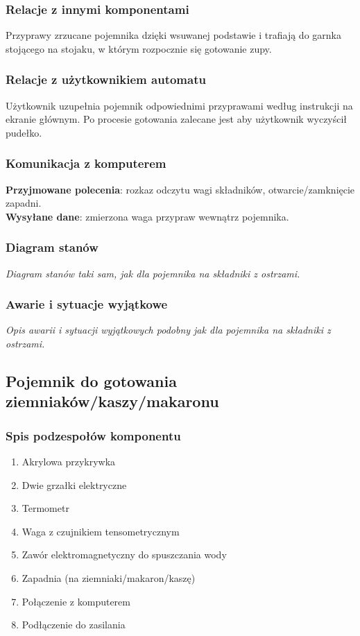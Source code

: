 \documentclass[12pt,a4paper,notitlepage]{article}
\begin{document}
\subsubsection{Relacje z innymi komponentami}
Przyprawy zrzucane pojemnika dzięki wsuwanej podstawie i trafiają do garnka stojącego na stojaku, w którym rozpocznie się gotowanie zupy.

\subsubsection{Relacje z użytkownikiem automatu}
Użytkownik uzupełnia pojemnik odpowiednimi przyprawami według instrukcji na ekranie głównym. Po procesie gotowania zalecane jest aby użytkownik wyczyścił pudełko.

\subsubsection{Komunikacja z komputerem}
\textbf{Przyjmowane polecenia}: rozkaz odczytu wagi składników, otwarcie/zamknięcie zapadni.\\
\textbf{Wysyłane dane}: zmierzona waga przypraw wewnątrz pojemnika.

\subsubsection{Diagram stanów}
\emph{Diagram stanów taki sam, jak dla pojemnika na składniki z ostrzami.}

\subsubsection{Awarie i sytuacje wyjątkowe}
\emph{Opis awarii i sytuacji wyjątkowych podobny jak dla pojemnika na składniki z ostrzami.}


\subsection{Pojemnik do gotowania ziemniaków/kaszy/makaronu}
\subsubsection{Spis podzespołów komponentu}
\begin{enumerate}
  \item Akrylowa przykrywka
  \item Dwie grzałki elektryczne
  \item Termometr
  \item Waga z czujnikiem tensometrycznym
  \item Zawór elektromagnetyczny do spuszczania wody
  \item Zapadnia (na ziemniaki/makaron/kaszę)
  \item Połączenie z komputerem
  \item Podłączenie do zasilania
\end{enumerate}
\end{document}
